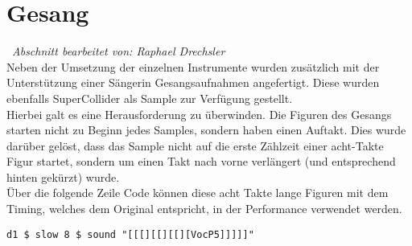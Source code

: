 \documentclass[
10pt, %
a4paper, %
oneside, %
headinclude,footinclude, %
BCOR5mm, %
]{scrartcl}
\begin{document}
\section{Gesang}\
\textit{Abschnitt bearbeitet von: Raphael Drechsler}\\

\noindent Neben der Umsetzung der einzelnen Instrumente wurden zusätzlich mit der Unterstützung einer Sängerin Gesangsaufnahmen angefertigt. Diese wurden ebenfalls SuperCollider als Sample zur Verfügung gestellt.\\
Hierbei galt es eine Herausforderung zu überwinden. Die Figuren des Gesangs starten nicht zu Beginn jedes Samples, sondern haben einen Auftakt. Dies wurde darüber gelöst, dass das Sample nicht auf die erste Zählzeit einer acht-Takte Figur startet, sondern um einen Takt nach vorne verlängert (und entsprechend hinten gekürzt) wurde.\\ 
Über die folgende Zeile Code können diese acht Takte lange Figuren mit dem Timing, welches dem Original entspricht, in der Performance verwendet werden.


\begin{lstlisting}
d1 $ slow 8 $ sound "[[[][[][[][VocP5]]]]]"
\end{lstlisting}

\pagebreak







\renewcommand{\refname}{\spacedlowsmallcaps{Literatur/Quellen}} %




\end{document}
